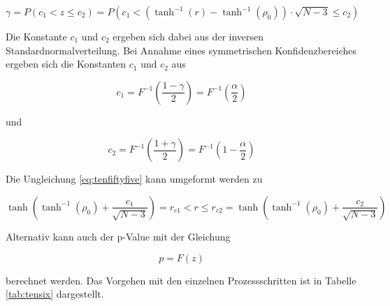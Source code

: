 \begin{equation}\label{eq:tenfiftyfive}
\gamma =P\left(c_{1} <z\le c_{2} \right)=P\left(c_{1} <\left(\tanh ^{-1} (r)-\tanh ^{-1} (\rho _{0} )\right)\cdot \sqrt{N-3} \le c_{2} \right)
\end{equation}

\noindent Die Konstante $c_{1}$ und $c_{2}$ ergeben sich dabei aus der inversen Standardnormalverteilung. Bei Annahme eines symmetrischen Konfidenzbereiches ergeben sich die Konstanten $c_{1}$ und $c_{2}$ aus 

\begin{equation}\label{eq:tenfiftysix}
c_{1} =F^{-1} \left(\dfrac{1-\gamma }{2} \right)=F^{-1} \left(\dfrac{\alpha }{2} \right)
\end{equation}

\noindent und

\begin{equation}\label{eq:tenfiftyseven}
c_{2} =F^{-1} \left(\dfrac{1+\gamma }{2} \right)=F^{-1} \left(1-\dfrac{\alpha }{2} \right)
\end{equation}

\noindent Die Ungleichung \eqref{eq:tenfiftyfive} kann umgeformt werden zu

\begin{equation}\label{eq:tenfiftyeight}
\tanh \left(\tanh ^{-1} (\rho _{0})+\dfrac{c_{1} }{\sqrt{N-3}} \right)=r_{c1} <r\le r_{c2} =\tanh \left(\tanh ^{-1} (\rho _{0})+\dfrac{c_{2}}{\sqrt{N-3}} \right)
\end{equation}

\noindent Alternativ kann auch der p-Value mit der Gleichung

\begin{equation}\label{eq:tenfiftynine}
p=F(z)
\end{equation}

\noindent berechnet werden. Das Vorgehen mit den einzelnen Prozessschritten ist in Tabelle \ref{tab:tensix} dargestellt.

\clearpage


